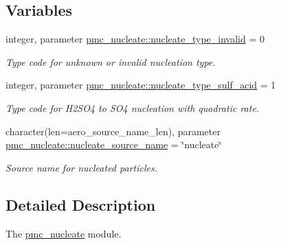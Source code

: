\subsection*{Variables}
\begin{DoxyCompactItemize}
\item 
integer, parameter \mbox{\hyperlink{namespacepmc__nucleate_a9b3294f7b14e77755d00cdf9083befe5}{pmc\+\_\+nucleate\+::nucleate\+\_\+type\+\_\+invalid}} = 0
\begin{DoxyCompactList}\small\item\em Type code for unknown or invalid nucleation type. \end{DoxyCompactList}\item 
integer, parameter \mbox{\hyperlink{namespacepmc__nucleate_a0bc83e4138421dbce4f88810145e181b}{pmc\+\_\+nucleate\+::nucleate\+\_\+type\+\_\+sulf\+\_\+acid}} = 1
\begin{DoxyCompactList}\small\item\em Type code for H2\+S\+O4 to S\+O4 nucleation with quadratic rate. \end{DoxyCompactList}\item 
character(len=aero\+\_\+source\+\_\+name\+\_\+len), parameter \mbox{\hyperlink{namespacepmc__nucleate_ac08d8268c41b7f65623b08b460233e9c}{pmc\+\_\+nucleate\+::nucleate\+\_\+source\+\_\+name}} = \char`\"{}nucleate\char`\"{}
\begin{DoxyCompactList}\small\item\em Source name for nucleated particles. \end{DoxyCompactList}\end{DoxyCompactItemize}


\subsection{Detailed Description}
The \mbox{\hyperlink{namespacepmc__nucleate}{pmc\+\_\+nucleate}} module. 


